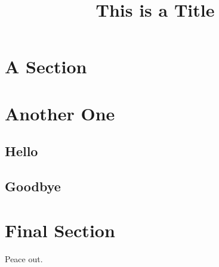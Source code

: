 \documentclass{article}
\begin{document}
  \title{This is a Title}
  \date{}
  \maketitle
  \tableofcontents
  \section{A Section}
  \lipsum[1]
  \section{Another One}
  \subsection{Hello}
  \lipsum[1]
  \subsection{Goodbye}
  \lipsum[1]
  \section{Final Section}
  Peace out.
\end{document}
